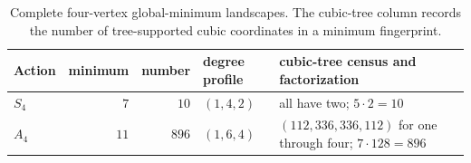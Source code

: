 \begin{table}[htbp]
\centering
\small
\caption{Complete four-vertex global-minimum landscapes.  The cubic-tree
column records the number of tree-supported cubic coordinates in a minimum
fingerprint.}
\label{tab:n4-landscapes}
\begin{tabularx}{\textwidth}{lrr>{\raggedright\arraybackslash}p{}>{\raggedright\arraybackslash}X}
\toprule
Action & minimum & number & degree profile & cubic-tree census and factorization\\
\midrule
$S_4$ & $7$ & $10$ & $(1,4,2)$ & all have two; $5\cdot2=10$\\
$A_4$ & $11$ & $896$ & $(1,6,4)$ & $(112,336,336,112)$ for one through four; $7\cdot128=896$\\
\bottomrule
\end{tabularx}
\end{table}
